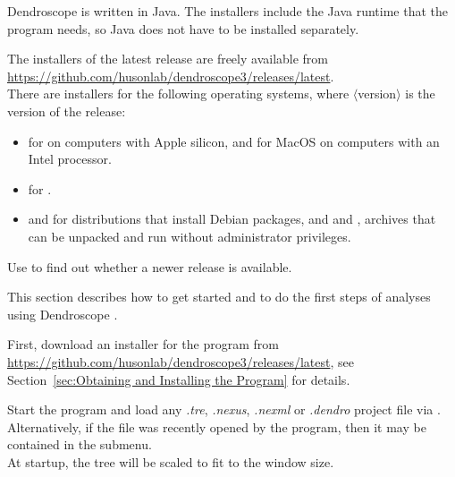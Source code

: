 \documentclass[11pt]{article}
\def\Dendroscope{{\sf Dendroscope }}
\begin{document}
\Dendroscope is written in Java. The installers include the Java runtime that the program needs, so Java does
not have to be installed separately.

The installers of the latest release are freely available from\\
\url{https://github.com/husonlab/dendroscope3/releases/latest}.\\
There are installers for the following operating systems, where $\langle$version$\rangle$ is the
version of the release:
\begin{itemize}
\item {} for  on computers with Apple silicon,
and  for MacOS on computers with an Intel processor.
\item {} for .
\item {} and 
for  distributions that install Debian packages, and
 and
, archives that can be unpacked and run
without administrator privileges.
\end{itemize}

Use  to find out whether a newer release is available.


This section describes how to get started and to do the first steps of analyses 
using \Dendroscope.

First, download an installer for the program from
\url{https://github.com/husonlab/dendroscope3/releases/latest},
see Section~\ref{sec:Obtaining and Installing the Program}
for details.

Start the program and load any \textit{.tre}, \textit{.nexus}, \textit{.nexml} or \textit{.dendro} 
project file via . Alternatively, if the file
was recently opened by the program, then it may be contained in
the  submenu.\\
At startup, the tree will be scaled to fit to the window size. 
\end{document}
